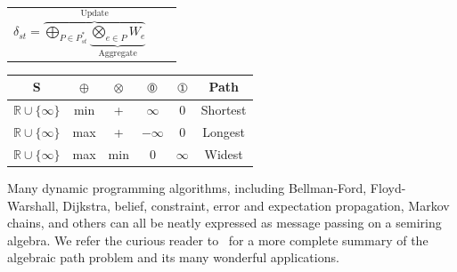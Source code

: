 \documentclass[sigplan,10pt,review,anonymous]{acmart}
\begin{document}
\begin{center}
  \begin{tabular}{lc}
    $\delta_{st} = \overbrace{\underset{P\in P_{st}^*}{\bigoplus}\underbrace{\underset{e\in P}{\bigotimes}W_{e}}_{\text{Aggregate}}}^{\text{Update}}$ & & &
  \end{tabular}
  \begin{tabular}{c|c{1cm}c{1cm}|c{1cm}c{1cm}|c}
    S                           & $\oplus$ & $\otimes$ & $\circled{0}$ & $\circled{1}$ & Path     \\\hline
    $\mathbb R \cup \{\infty\}$ & min      & +         &   $\infty$    &      0        & Shortest \\
    $\mathbb R \cup \{\infty\}$ & max      & +         &   $-\infty$   &      0        & Longest  \\
    $\mathbb R \cup \{\infty\}$ & max      & min       &       0       &   $\infty$    & Widest   \\
  \end{tabular}
\end{center}

\noindent Many dynamic programming algorithms, including Bellman-Ford, Floyd-Warshall, Dijkstra, belief, constraint, error and expectation propagation, Markov chains, and others can all be neatly expressed as message passing on a semiring algebra. We refer the curious reader to~\cite{gondran2008graphs,baras2010path} for a more complete summary of the algebraic path problem and its many wonderful applications.

%
%
\end{document}
